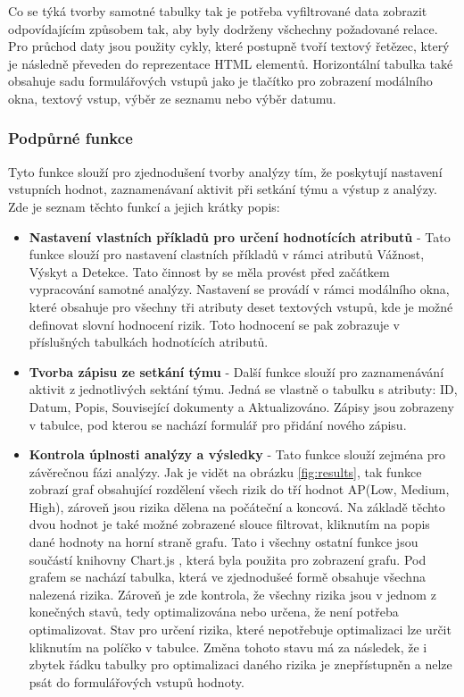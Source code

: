 Co se týká tvorby samotné tabulky tak je potřeba vyfiltrované data zobrazit odpovídajícím způsobem tak, aby byly dodrženy všchechny požadované relace. Pro průchod daty jsou použity cykly, které postupně tvoří textový řetězec, který je následně převeden do reprezentace HTML elementů. Horizontální tabulka také obsahuje sadu formulářových vstupů jako je tlačítko pro zobrazení modálního okna, textový vstup, výběr ze seznamu nebo výběr datumu.


\subsubsection{Podpůrné funkce}
Tyto funkce slouží pro zjednodušení tvorby analýzy tím, že poskytují nastavení vstupních hodnot, zaznamenávaní aktivit při setkání týmu a výstup z analýzy. Zde je seznam těchto funkcí a jejich krátky popis:
\begin{itemize}
    \item \textbf{Nastavení vlastních příkladů pro určení hodnotících atributů} - Tato funkce slouží pro nastavení clastních příkladů v rámci atributů Vážnost, Výskyt a Detekce. Tato činnost by se měla provést před začátkem vypracování samotné analýzy. Nastavení se provádí v rámci modálního okna, které obsahuje pro všechny tři atributy deset textových vstupů, kde je možné definovat slovní hodnocení rizik. Toto hodnocení se pak zobrazuje v příslušných tabulkách hodnotících atributů. 
    \item \textbf{Tvorba zápisu ze setkání týmu} - Další funkce slouží pro zaznamenávání aktivit z jednotlivých sektání týmu. Jedná se vlastně o tabulku s atributy: ID, Datum, Popis, Související dokumenty a Aktualizováno. Zápisy jsou zobrazeny v tabulce, pod kterou se nachází formulář pro přidání nového zápisu. 
 \item \textbf{Kontrola úplnosti analýzy a výsledky} - Tato funkce slouží zejména pro závěrečnou fázi analýzy. Jak je vidět na obrázku \ref{fig:results}, tak funkce zobrazí graf obsahující rozdělení všech rizik do tří hodnot AP(Low, Medium, High), zároveň jsou rizika dělena na počáteční a koncová. Na základě těchto dvou hodnot je také možné zobrazené slouce filtrovat, kliknutím na popis dané hodnoty na horní straně grafu. Tato i všechny ostatní funkce jsou součástí knihovny Chart.js \cite{chart}, která byla použita pro zobrazení grafu. 
 Pod grafem se nachází tabulka, která ve zjednodušeé formě obsahuje všechna nalezená rizika. Zároveň je zde kontrola, že všechny rizika jsou v jednom z konečných stavů, tedy optimalizována nebo určena, že není potřeba optimalizovat. Stav pro určení rizika, které nepotřebuje optimalizaci lze určit kliknutím na políčko v tabulce. Změna tohoto stavu má za následek, že i zbytek řádku tabulky pro optimalizaci daného rizika je znepřístupněn a nelze psát do formulářových vstupů hodnoty. 
\end{itemize}

